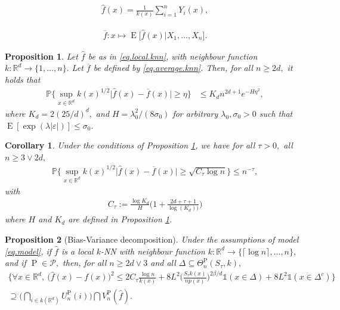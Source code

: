 \documentclass[10pt,a4paper]{amsart}
\newtheorem{proposition}{Proposition}
\newtheorem{corollary}{Corollary}
\newcommand{\E}{\operatorname{E}}
\renewcommand{\P}{\operatorname{P}}
\newcommand{\PP}{\mathbb{P}}
\newcommand{\RR}{\mathbb{R}}
\newcommand{\eps}{\varepsilon}
\newcommand{\mP}{\mathcal{P}}
\newcommand{\ol}{\overline}
\newcommand{\wh}{\widehat}
\begin{document}
\begin{align}
    \label{eq.local.knn}
    \wh f(x) = \frac{1}{k(x)}\sum_{i=1}^n Y_i(x),
\end{align}

\begin{align}
    \label{eq.average.knn}
    \ol f\colon x \mapsto \E\big[\wh f(x)|X_1, \dots, X_n\big].
\end{align}

\begin{proposition}\label{prop.variance.bound.general.case}
Let $\wh f$ be as in \eqref{eq.local.knn}, with neighbour function $k \colon \RR^d \to \{1, \dots, n\}.$ Let $\ol f$ be defined by \eqref{eq.average.knn}.
Then, for all $n\geq 2d,$ it holds that
\begin{align*}
    \PP\Bigg\{\sup_{x \in \RR^d}k(x)^{1/2}\big|\wh f(x) - \ol f(x)\big| \geq \eta\Bigg\} &\leq K_dn^{2d + 1}e^{-H \eta^2},
\end{align*}
where $K_d = 2(25/d)^d,$ and $H = \lambda_0^2/(8\sigma_0)$ for arbitrary $\lambda_0, \sigma_0 > 0$ such that $\E[\exp(\lambda|\eps|)] \leq \sigma_0.$
\end{proposition}

\begin{corollary}
    \label{cor.variance.bound.nice.version}
    Under the conditions of Proposition \ref{prop.variance.bound.general.case}, we have for all $\tau > 0,$ all $n \geq 3 \vee 2d,$
    \begin{align*}
        \PP\Bigg\{\sup_{x \in \RR^d}k(x)^{1/2}\big|\wh f(x) - \ol f(x)\big|\geq \sqrt{C_\tau \log n}\Bigg\} \leq n^{-\tau},
    \end{align*}
    with 
    \begin{align*}
        C_\tau := \frac{\log K_d}{H}\bigg(1 + \frac{2d + \tau + 1 }{\log(K_d))}\bigg)
    \end{align*} where $H$ and $K_d$ are defined in Proposition \ref{prop.variance.bound.general.case}.
\end{corollary}

\begin{proposition}[Bias-Variance decomposition]
    \label{prop.decomp.knn}
    Under the assumptions of model \eqref{eq.model}, if $\wh f$ is a local $k$-NN with neighbour function $k\colon \RR^d \to \{\lceil \log n\rceil, \dots, n\},$ and if $\P \in \mP,$ then, for all $n \geq 2d \vee 3$ and all $\Delta \subseteq \Theta_n^{\P}(S_\tau, k),$
    \begin{multline*}
        \Bigg\{\forall x \in \RR^d,\ \big(\wh f(x) - f(x)\big)^2 \leq 2C_\tau\frac{\log n}{k(x)} + 8L^2\bigg(\frac{S_\tau k(x)}{np(x)}\bigg)^{2\beta/d}\mathds{1}(x \in \Delta) + 8L^2\mathds{1}(x \in \Delta^c)\Bigg\}\\
        \supseteq \bigg(\bigcap_{i \in k(\RR^d)}U_n^{\P}(i)\bigg)\bigcap V_n^{\P}(\wh f).
    \end{multline*}
\end{proposition}
\end{document}
